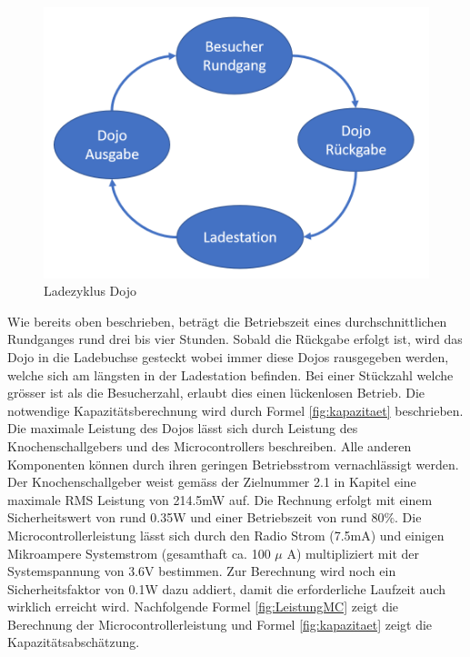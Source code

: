 \begin{figure}[H]
	\begin{center}
		\includegraphics[width=120mm]{data/LadezyklusDojo.png}
		\caption{Ladezyklus Dojo} %
		\label{fig:Ladezyklus Dojo}
	\end{center}
\end{figure}

Wie bereits oben beschrieben, beträgt die Betriebszeit eines durchschnittlichen Rundganges rund drei bis vier Stunden. Sobald die Rückgabe erfolgt ist, wird das Dojo in die Ladebuchse gesteckt wobei immer diese Dojos rausgegeben werden, welche sich am längsten in der Ladestation befinden. Bei einer Stückzahl welche grösser ist als die Besucherzahl, erlaubt dies einen lückenlosen Betrieb.
Die notwendige Kapazitätsberechnung wird durch Formel \ref{fig:kapazitaet} beschrieben. Die maximale Leistung des Dojos lässt sich durch Leistung des Knochenschallgebers und des Microcontrollers beschreiben. Alle anderen Komponenten können durch ihren geringen Betriebsstrom vernachlässigt werden. Der Knochenschallgeber weist gemäss der Zielnummer 2.1 in Kapitel \pageref{Projektziele} eine maximale RMS Leistung von 214.5mW auf. Die Rechnung erfolgt mit einem Sicherheitswert von rund 0.35W und einer Betriebszeit von rund 80$\%$. Die Microcontrollerleistung lässt sich durch den Radio Strom (7.5mA) und einigen Mikroampere Systemstrom (gesamthaft ca. 100 $\mu$ A) multipliziert mit der Systemspannung von 3.6V bestimmen. Zur Berechnung wird noch ein Sicherheitsfaktor von 0.1W dazu addiert, damit die erforderliche Laufzeit auch wirklich erreicht wird. Nachfolgende Formel \ref{fig:LeistungMC} zeigt die Berechnung der Microcontrollerleistung und Formel \ref{fig:kapazitaet} zeigt die Kapazitätsabschätzung.

